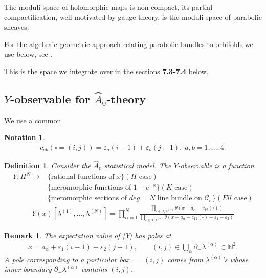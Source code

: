 \documentclass[12pt]{article}
\newtheorem{defn}{Definition}[section]
\newtheorem{rem}{Remark}[section]
\newtheorem{nt}{Notation}[section]
\numberwithin{equation}{section}
\theoremstyle{definition}
\begin{document}
The moduli space of holomorphic maps is non-compact, its partial compactification, well-motivated by gauge theory, is the moduli space of parabolic sheaves. 

For the algebraic geometric approach relating parabolic bundles to orbifolds we use below, see \cite{biswas}.

This is the space we integrate over in the sections {\bf 7.3-7.4} below. 






\subsection{$Y$-observable for $\hat{A}_{0}$-theory}
We use a common
\begin{nt}\normalfont
    \begin{align*}
         c_{ab}(\square = (i, j)) = \varepsilon_a (i-1) + \varepsilon_b (j-1), \; a, b = 1, ..., 4.
    \end{align*}
\end{nt}
\begin{defn}\normalfont
    Consider the $\hat{A}_{0}$ statistical model. The $Y$-observable is a function
    \begin{align*}
Y: \Pi^{N} \rightarrow &\{\text{rational functions of } x\} (H \text{ case})\\
&\{\text{meromorphic functions of } 1 - e^{-x}\} (K \text{ case})\\
&\{\text{meromorphic sections of $deg = N$ line bundle on $\mathcal{C}_{\sigma}$}\} (Ell \text{ case})
\end{align*}
\begin{align}\label{Y}
    Y(x)[\lambda^{(1)}, ..., \lambda^{(N)}] = \prod\limits_{\alpha = 1}^{N} \frac{\prod\limits_{\square \in \partial_{+}\lambda^{(\alpha)}}\theta(x - a_{\alpha} - c_{12}(\square))}{\prod\limits_{\square \in \partial_{-}\lambda^{(\alpha)}}\theta(x - a_{\alpha} - c_{12}(\square) - \varepsilon_1 - \varepsilon_2 )}
\end{align}
\end{defn}
\begin{rem}\normalfont
    The expectation value of \eqref{Y}
has poles at
\begin{align}\label{pole}
    x = a_{\alpha} + \varepsilon_1 (i - 1) + \varepsilon_2 (j - 1), \qquad (i, j) \in \bigcup\limits_{\alpha}\partial_{-}\lambda^{(\alpha)} \subset \mathbb{N}^2.
\end{align}
A pole corresponding to a particular box $\square = (i, j)$ comes from $\lambda^{(\alpha)}$'s whose inner boundary $\partial_{-} \lambda^{(\alpha)}$ contains $(i, j)$.
\end{rem}
\end{document}

